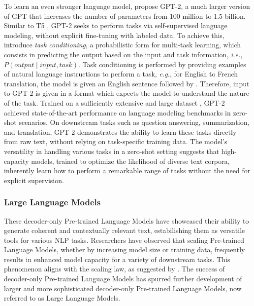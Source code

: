 To learn an even stronger language model, \citet{radford2019language} propose \ac{GPT}-2, a much larger version of \ac{GPT} that increases the number of parameters from 100 million to 1.5 billion. Similar to T5 \citep{raffel2020exploring}, \ac{GPT}-2 seeks to perform tasks via self-supervised language modeling, without explicit fine-tuning with labeled data. To achieve this, \citet{radford2019language} introduce \textit{task conditioning}, a probabilistic form for multi-task learning, which consists in predicting the output based on the input and task information, \textit{i.e.}, $P(output \mid input, task)$. Task conditioning is performed by providing examples of natural language instructions to perform a task, \textit{e.g.}, for English to French translation, the model is given an English sentence followed by . Therefore, input to \ac{GPT}-2 is given in a format which expects the model to understand the nature of the task. Trained on a sufficiently extensive and large dataset \citep{radford2019language}, \ac{GPT}-2 achieved state-of-the-art performance on language modeling benchmarks \citep{marcus1993building, chelba2013one, merity2016pointer} in zero-shot scenarios. On downstream tasks such as question answering, summarization, and translation, \ac{GPT}-2 demonstrates the ability to learn these tasks directly from raw text, without relying on task-specific training data. The model's versatility in handling various tasks in a zero-shot setting suggests that high-capacity models, trained to optimize the likelihood of diverse text corpora, inherently learn how to perform a remarkable range of tasks without the need for explicit supervision.




\subsubsection{Large Language Models}

These decoder-only Pre-trained Language Models have showcased their ability to generate coherent and contextually relevant text, estabilishing them as versatile tools for various \ac{NLP} tasks. Researchers have observed that scaling Pre-trained Language Models, whether by increasing model size or training data, frequently results in enhanced model capacity for a variety of downstream tasks. This phenomenon aligns with the scaling law, as suggested by \citet{kaplan2020scaling}. The success of decoder-only Pre-trained Language Models has spurred further development of larger and more sophisticated decoder-only Pre-trained Language Models, now referred to as Large Language Models.

